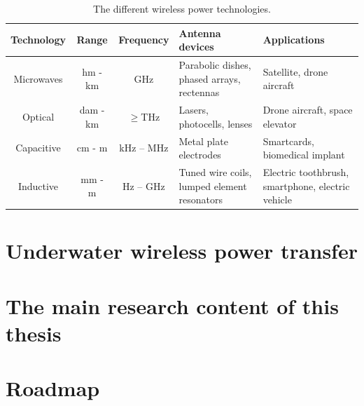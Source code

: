\makeatletter
\newcommand{\thickhline}{%
\noalign {\ifnum 0=`}\fi \hrule height 1pt
    \futurelet \reserved@a \@xhline
}
\makeatother

\begin{table}[h!]
    \centering
    \caption{The different wireless power technologies.}
    \begin{tabular}{ |c|c|c|m{3.5cm}<{\centering}|m{3.5cm}<{\centering}| }
        \hline
        \textbf{Technology} & \textbf{Range} & \textbf{Frequency}         & \textbf{Antenna devices}                    & \textbf{Applications}                             \\\hline
Microwaves          & hm - km        & GHz                        & Parabolic dishes, phased arrays, rectennas  & Satellite, drone aircraft                         \\ \hline
Optical             & dam - km
                    & $\geq$THz      & Lasers, photocells, lenses & Drone aircraft, space elevator                                                                  \\ \hline
Capacitive          & cm - m         & kHz – MHz                  & Metal plate electrodes                      & Smartcards, biomedical implant
\\ \hline
Inductive           & mm - m         & Hz – GHz                   & Tuned wire coils, lumped element resonators & Electric toothbrush, smartphone, electric vehicle
\\ \hline
    \end{tabular}
\end{table}

\section{Underwater wireless power transfer}



\section{The main research content of this thesis}

\section{Roadmap}